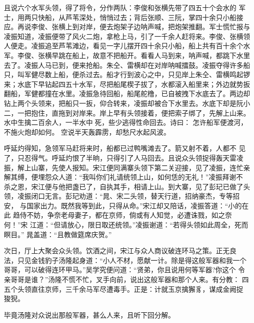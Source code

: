且说六个水军头领，得了将令，分作两队：李俊和张横先带了四五十个会水的
军士，用两只快船，从芦苇深处，悄悄过去；背后张顺、三阮，掌四十余只小船接
应。再说李俊、张横上到对岸，便去炮架子边呐声喊，把炮架推翻。军士慌忙报与
凌振知道，凌振便带了风火二炮，拿枪上马，引了一千余人赶将来。李俊、张横领
人便走。凌振追至芦苇滩边，看见一字儿摆开四十余只小船，船上共有百十余个水
军。李俊、张横早跳在船上，故意不把船开。看看人马到来，呐声喊，都跳下水里
去了。凌振人马已到，便来抢船。朱仝、雷横却在对岸呐喊擂鼓。凌振夺得许多船
只，叫军健尽数上船，便杀过去。船才行到波心之中，只见岸上朱仝、雷横鸣起锣
来；水底下早钻起四五十水军，尽把船尾楔子拔了，水都滚入船里来；外边就势扳
翻船，军健都撞在水里。凌振急待回船，船尾舵橹，已自被拽下水底去了。两边却
钻上两个头领来，把船只一扳，仰合转来，凌振却被合下水里去。水底下却是阮小
二，一把抱住，直拖到对岸来。岸上早有头领接着，便把索子绑了，先解上山来。
水中生擒二百余人，一半水中死，些少逃得性命回去。诗曰：
怎许船军便渡河，不施火炮却如何。
空说半天轰霹雳，却愁尺水起风波。

呼延灼得知，急领军马赶将来时，船都已过鸭嘴滩去了。箭又射不着，人都不
见了，只忍得气。呼延灼恨了半晌，只得引了人马回去。且说众头领捉得轰天雷凌
振，解上山寨，先使人报知。宋江便同满寨头领下第二关迎接，见了凌振，连忙亲
解其缚，便埋怨众人道：“我叫你们礼请统领上山，如何恁的无礼！”凌振拜谢不
杀之恩，宋江便与他把盏已了，自执其手，相请上山。到大寨，见了彭玘已做了头
领，凌振闭口无言。彭玘劝道：“晁、宋二头领，替天行道，招纳豪杰，专等招安，
与国家出力。既然我等到此，只得从命。”宋江却又陪话，凌振答道：“小的在此
趋侍不妨，争奈老母妻子，都在京师，倘或有人知觉，必遭诛戮，如之奈何！”宋
江道：“但请放心，限日取还统领。”凌振谢道：“若得头领如此周全，死而瞑目。”
晁盖道：“且教做筵席庆贺。”

次日，厅上大聚会众头领。饮酒之间，宋江与众人商议破连环马之策。正无良
法，只见金钱豹子汤隆起身道：“小人不材，愿献一计。除是得这般军器和我一个
哥哥，可以破得连环甲马。”吴学究便问道：“贤弟，你且说用何等军器?你这个
令亲哥哥是谁？”汤隆不慌不忙，叉手向前，说出这般军器和那个人来。有分教：
四五个头领直往京师，三千余马军尽遭毒手。正是：计就玉京擒獬豸，谋成金阙捉
狻猊。

毕竟汤隆对众说出那般军器，甚么人来，且听下回分解。